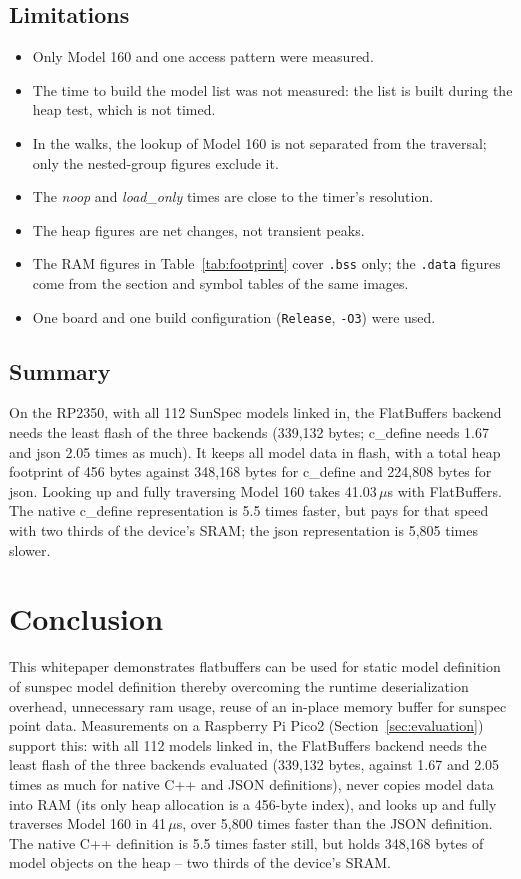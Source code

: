 \documentclass{article}
\begin{document}
\subsection{Limitations}
\begin{itemize}
    \item Only Model 160 and one access pattern were measured.
    \item The time to build the model list was not measured: the list is built during the heap test, which is not timed.
    \item In the walks, the lookup of Model 160 is not separated from the traversal; only the nested-group figures exclude it.
    \item The \textit{noop} and \textit{load\_only} times are close to the timer's resolution.
    \item The heap figures are net changes, not transient peaks.
    \item The RAM figures in Table~\ref{tab:footprint} cover \texttt{.bss} only; the \texttt{.data} figures come from the section and symbol tables of the same images.
    \item One board and one build configuration (\texttt{Release}, \texttt{-O3}) were used.
\end{itemize}

\subsection{Summary}
On the RP2350, with all 112 SunSpec models linked in, the FlatBuffers backend needs the least flash of the three backends (339{,}132 bytes; c\_define needs 1.67 and json 2.05 times as much). It keeps all model data in flash, with a total heap footprint of 456 bytes against 348{,}168 bytes for c\_define and 224{,}808 bytes for json. Looking up and fully traversing Model 160 takes 41.03\,$\mu$s with FlatBuffers. The native c\_define representation is 5.5 times faster, but pays for that speed with two thirds of the device's SRAM; the json representation is 5{,}805 times slower.

\section{Conclusion}
This whitepaper demonstrates flatbuffers can be used for static model definition of sunspec model definition thereby overcoming the runtime deserialization overhead, unnecessary ram usage, reuse of an in-place memory buffer for sunspec point data. Measurements on a Raspberry Pi Pico2 (Section~\ref{sec:evaluation}) support this: with all 112 models linked in, the FlatBuffers backend needs the least flash of the three backends evaluated (339{,}132 bytes, against 1.67 and 2.05 times as much for native C++ and JSON definitions), never copies model data into RAM (its only heap allocation is a 456-byte index), and looks up and fully traverses Model 160 in 41\,$\mu$s, over 5{,}800 times faster than the JSON definition. The native C++ definition is 5.5 times faster still, but holds 348{,}168 bytes of model objects on the heap -- two thirds of the device's SRAM.
\end{document}
